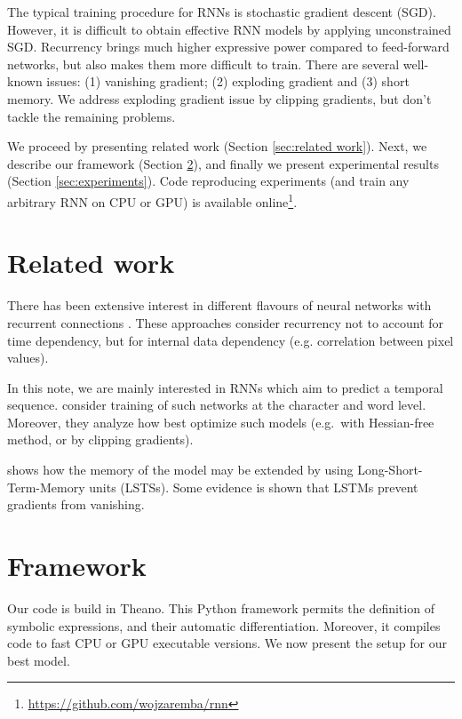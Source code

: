 \documentclass{article}
\begin{document}
The typical training procedure for RNNs is stochastic gradient descent
(SGD). However, it is difficult to obtain effective RNN models by
applying unconstrained SGD.  Recurrency brings much higher expressive
power compared to feed-forward networks, but also makes them more
difficult to train. There are several well-known issues: (1) vanishing
gradient; (2) exploding gradient and (3) short memory. We address
exploding gradient issue by clipping gradients, but don't tackle the 
remaining problems.


We proceed by presenting related work (Section \ref{sec:related
  work}). Next, we describe our framework (Section
\ref{sec:framework}), and finally we present experimental results
(Section \ref{sec:experiments}).  Code reproducing
experiments (and train any arbitrary RNN on CPU or GPU) is available
online\footnote{\url{https://github.com/wojzaremba/rnn}}.

\section{Related work}\label{sec:related work}
There has been extensive interest in different flavours of neural networks 
with recurrent connections \cite{hopfield1982neural, hinton2006fast}. These
approaches consider recurrency not to account for time dependency, but
for internal data dependency (e.g. correlation between pixel values). 


In this note, we are mainly interested in RNNs which aim to predict 
a temporal sequence. \cite{mikolov2012statistical} 
\cite{sutskever2013training} consider
training of such networks at the character and word level. Moreover,
they analyze how best optimize such models (e.g.~with Hessian-free method, or 
by clipping gradients).


\cite{graves2013generating} shows how the memory of the model may be
extended by using Long-Short-Term-Memory units (LSTSs). Some evidence
is shown that LSTMs prevent gradients from vanishing.

\section{Framework}\label{sec:framework}
Our code is build in Theano. This Python framework permits the
definition of symbolic expressions, and their automatic
differentiation. Moreover, it compiles code to fast CPU or GPU
executable versions. We now present the setup for our best model.
\end{document}
